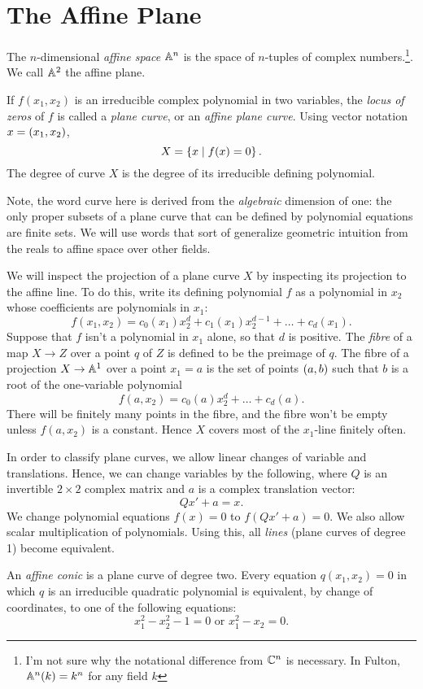 \documentclass{report}
\begin{document}
\section{The Affine Plane}
The $n$-dimensional \emph{affine space} $\AA^n$ is the space of $n$-tuples of complex numbers.\footnote{I'm not sure why the notational difference from $\CC^n$ is necessary.
In Fulton, $\AA^n(k) = k^n$ for any field $k$}.
We call $\AA^2$ the affine plane.

If $f(x_1,x_2)$ is an irreducible complex polynomial in two variables, the \emph{locus of zeros} of $f$ is called a \emph{plane curve}, or an \emph{affine plane curve}.
Using vector notation $x = \prn{x_1,x_2}$, 
\[ X = \cbr{x \mid f(x) = 0}. \]
The degree of curve $X$ is the degree of its irreducible defining polynomial.

Note, the word curve here is derived from the \emph{algebraic} dimension of one: the only proper subsets of a plane curve that can be defined by polynomial equations are finite sets.
We will use words that sort of generalize geometric intuition from the reals to affine space over other fields.

We will inspect the projection of a plane curve $X$ by inspecting its projection to the affine line.
To do this, write its defining polynomial $f$ as a polynomial in $x_2$ whose coefficients are polynomials in $x_1$:
\[
  f(x_1,x_2) = c_0(x_1)x_2^d + c_1(x_1)x_2^{d-1} + \dots + c_d(x_1).
\]
Suppose that $f$ isn't a polynomial in $x_1$ alone, so that $d$ is positive.
The \emph{fibre} of a map $X \rightarrow Z$ over a point $q$ of $Z$ is defined to be the preimage of $q$.
The fibre of a projection $X \rightarrow \AA^1$ over a point $x_1 = a$ is the set of points $\prn{a,b}$ such that $b$ is a root of the one-variable polynomial
\[
  f(a,x_2) = c_0(a)x_2^d + \dots + c_d(a).
\]
There will be finitely many points in the fibre, and the fibre won't be empty unless $f(a,x_2)$ is a constant.
Hence $X$ covers most of the $x_1$-line finitely often.

In order to classify plane curves, we allow linear changes of variable and translations.
Hence, we can change variables by the following, where $Q$ is an invertible $2 \times 2$ complex matrix and $a$ is a complex translation vector:
\[ Qx' + a = x. \]
We change polynomial equations $f(x) = 0$ to $f(Qx' + a) = 0$.
We also allow scalar multiplication of polynomials.
Using this, all \emph{lines} (plane curves of degree 1) become equivalent.

An \emph{affine conic} is a plane curve of degree two.
Every equation $q(x_1,x_2) = 0$ in which $q$ is an irreducible quadratic polynomial is equivalent, by change of coordinates, to one of the following equations:
\[ x_1^2 - x_2^2 - 1 = 0 \text{   or   } x_1^2 - x_2 = 0. \]
\end{document}
